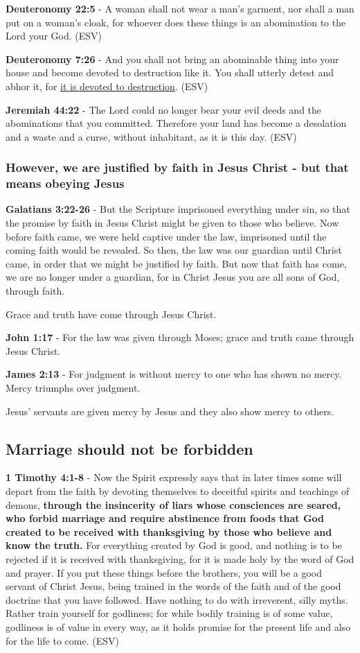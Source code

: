 \documentclass[11pt]{article}
\begin{document}
\textbf{Deuteronomy 22:5} - A woman shall not wear a man's garment, nor shall a man put on a woman's cloak, for whoever does these things is an abomination to the Lord your God. (ESV)

\textbf{Deuteronomy 7:26} - And you shall not bring an abominable thing into your house and become devoted to destruction like it. You shall utterly detest and abhor it, for \uline{it is devoted to destruction}. (ESV)

\textbf{Jeremiah 44:22} - The Lord could no longer bear your evil deeds and the abominations that you committed. Therefore your land has become a desolation and a waste and a curse, without inhabitant, as it is this day. (ESV)

\subsubsection{However, we are justified by faith in Jesus Christ - but that means obeying Jesus}
\label{sec:orgf31be88}
\textbf{Galatians 3:22-26} - But the Scripture imprisoned everything under sin, so that the promise by faith in Jesus Christ might be given to those who believe. Now before faith came, we were held captive under the law, imprisoned until the coming faith would be revealed. So then, the law was our guardian until Christ came, in order that we might be justified by faith. But now that faith has come, we are no longer under a guardian, for in Christ Jesus you are all sons of God, through faith.

Grace and truth have come through Jesus Christ.

\textbf{John 1:17} - For the law was given through Moses; grace and truth came through Jesus Christ.

\textbf{James 2:13} - For judgment is without mercy to one who has shown no mercy. Mercy triumphs over judgment.

Jesus' servants are given mercy by Jesus and they also show mercy to others.

\subsection{Marriage should not be forbidden}
\label{sec:org6c625f5}
\textbf{1 Timothy 4:1-8} - Now the Spirit expressly says that in later times some will depart from the faith by devoting themselves to deceitful spirits and teachings of demons, \textbf{through the insincerity of liars whose consciences are seared, who forbid marriage and require abstinence from foods that God created to be received with thanksgiving by those who believe and know the truth.} For everything created by God is good, and nothing is to be rejected if it is received with thanksgiving, for it is made holy by the word of God and prayer. If you put these things before the brothers, you will be a good servant of Christ Jesus, being trained in the words of the faith and of the good doctrine that you have followed. Have nothing to do with irreverent, silly myths. Rather train yourself for godliness; for while bodily training is of some value, godliness is of value in every way, as it holds promise for the present life and also for the life to come. (ESV)
\end{document}
